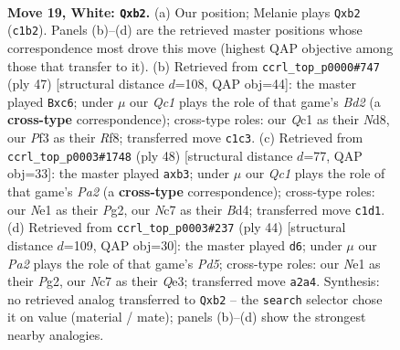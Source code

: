 \documentclass[11pt]{article}
\begin{document}
\clearpage

\begin{figure}[p]\centering
\begin{subfigure}{0.46\textwidth}\centering
\resizebox{\linewidth}{!}{%
\newchessgame
\chessboard[
  setfen={r1b2b1r/1pN2k2/1nn5/6pp/5p1q/3P1P2/Pp1BP1B1/R1Q1NRK1 w - - 1 19},
  showmover=false,
  pgfstyle=straightmove, color=movearrow, markmove={c1-b2}
]}
\caption{}
\end{subfigure}\hfill
\begin{subfigure}{0.46\textwidth}\centering
\resizebox{\linewidth}{!}{%
\newchessgame
\chessboard[
  setfen={3nqr1k/1r1bb1p1/2Pp1n1p/1p2p3/1P6/2P2N1P/Q4PP1/R1BBRNK1 b - - 0 24},
  showmover=false,
  pgfstyle=straightmove, color=movearrow, markmove={d7-c6}
]}
\caption{}
\end{subfigure}
\\[4pt]
\begin{subfigure}{0.46\textwidth}\centering
\resizebox{\linewidth}{!}{%
\newchessgame
\chessboard[
  setfen={r2rb1k1/1pq2pp1/3bpn1p/4N3/2PB4/1p1B3P/P1R1QPP1/3R2K1 w - - 0 25},
  showmover=false,
  pgfstyle=straightmove, color=movearrow, markmove={a2-b3}
]}
\caption{}
\end{subfigure}\hfill
\begin{subfigure}{0.46\textwidth}\centering
\resizebox{\linewidth}{!}{%
\newchessgame
\chessboard[
  setfen={r1r2bk1/3nRp1p/6p1/p1qP2BP/b3P3/4QN2/4BPP1/5RK1 w - - 5 23},
  showmover=false,
  pgfstyle=straightmove, color=movearrow, markmove={d5-d6}
]}
\caption{}
\end{subfigure}
\caption{\textbf{Move 19, White: \texttt{Qxb2}.} (a) Our position; Melanie plays \texttt{Qxb2} (\texttt{c1b2}). Panels (b)--(d) are the retrieved master positions whose correspondence most drove this move (highest QAP objective among those that transfer to it). (b) Retrieved from \texttt{ccrl\_top\_p0000\#747} (ply 47) [structural distance $d$=108, QAP obj=44]: the master played \texttt{Bxc6}; under $\mu$ our \emph{Qc1} plays the role of that game's \emph{Bd2} (a \textbf{cross-type} correspondence); cross-type roles: our \emph{Q}c1 as their \emph{N}d8, our \emph{P}f3 as their \emph{R}f8; transferred move \texttt{c1c3}. (c) Retrieved from \texttt{ccrl\_top\_p0003\#1748} (ply 48) [structural distance $d$=77, QAP obj=33]: the master played \texttt{axb3}; under $\mu$ our \emph{Qc1} plays the role of that game's \emph{Pa2} (a \textbf{cross-type} correspondence); cross-type roles: our \emph{N}e1 as their \emph{P}g2, our \emph{N}c7 as their \emph{B}d4; transferred move \texttt{c1d1}. (d) Retrieved from \texttt{ccrl\_top\_p0003\#237} (ply 44) [structural distance $d$=109, QAP obj=30]: the master played \texttt{d6}; under $\mu$ our \emph{Pa2} plays the role of that game's \emph{Pd5}; cross-type roles: our \emph{N}e1 as their \emph{P}g2, our \emph{N}c7 as their \emph{Q}e3; transferred move \texttt{a2a4}. Synthesis: no retrieved analog transferred to \texttt{Qxb2} -- the \texttt{search} selector chose it on value (material / mate); panels (b)--(d) show the strongest nearby analogies.}
\label{fig:thought-m36}
\end{figure}
\end{document}

